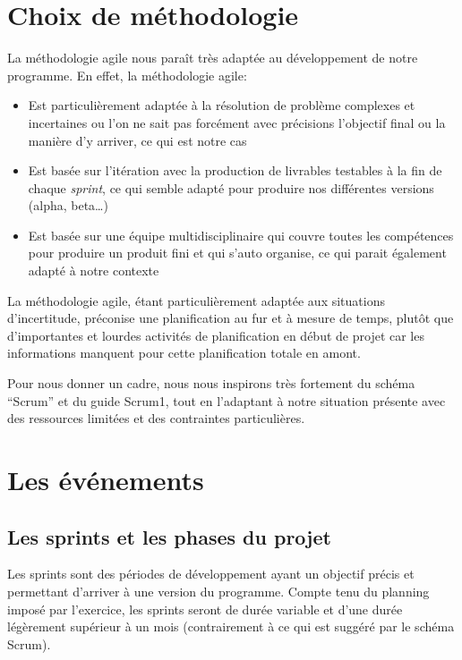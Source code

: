 \section{Choix de méthodologie}

La méthodologie agile nous paraît très adaptée au développement de notre programme.
En effet, la méthodologie agile:

\begin{itemize}
    \item  Est particulièrement adaptée à la résolution de problème complexes
          et incertaines ou l’on ne sait pas forcément avec précisions l’objectif
          final ou la manière d’y arriver, ce qui est notre cas
    \item Est basée sur l'itération avec la production de livrables testables
          à la fin de chaque \emph{sprint}, ce qui semble adapté pour produire nos différentes
          versions (alpha, beta…)
    \item Est basée sur une équipe multidisciplinaire qui couvre toutes les compétences
          pour produire un produit fini et qui s’auto organise, ce qui parait également
          adapté à notre contexte
\end{itemize}

La méthodologie agile, étant particulièrement adaptée aux situations d'incertitude, préconise
une planification au fur et à mesure de temps, plutôt que d’importantes et lourdes activités de 
planification en début de projet car les informations manquent pour cette planification totale en amont.

Pour nous donner un cadre, nous nous inspirons très fortement du schéma “Scrum” et du guide Scrum1, 
tout en l’adaptant à notre situation présente avec des ressources limitées et des contraintes particulières.

\section{Les événements}

\subsection{Les sprints et les phases du projet}


Les sprints sont des périodes de développement ayant un objectif précis et permettant d'arriver à une version du programme. 
Compte tenu du planning imposé par l’exercice, les sprints seront de durée variable et d'une durée légèrement supérieur à un 
mois (contrairement à ce qui est suggéré par le schéma Scrum).\\

